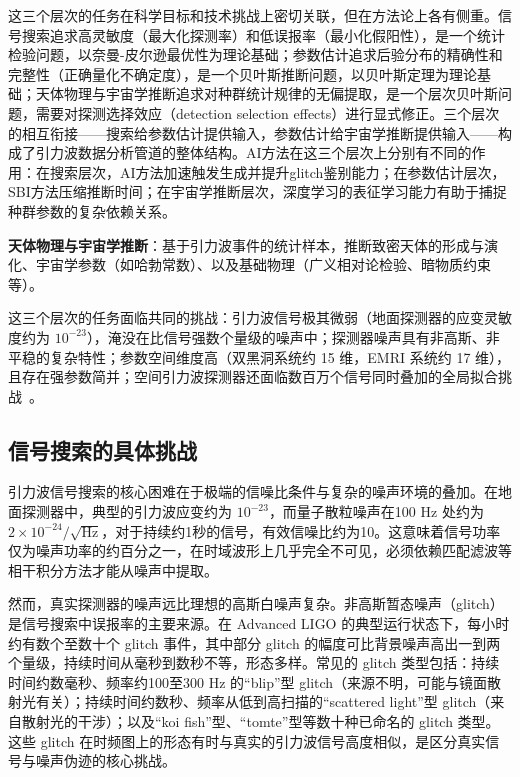 这三个层次的任务在科学目标和技术挑战上密切关联，但在方法论上各有侧重。信号搜索追求高灵敏度（最大化探测率）和低误报率（最小化假阳性），是一个统计检验问题，以奈曼-皮尔逊最优性为理论基础；参数估计追求后验分布的精确性和完整性（正确量化不确定度），是一个贝叶斯推断问题，以贝叶斯定理为理论基础；天体物理与宇宙学推断追求对种群统计规律的无偏提取，是一个层次贝叶斯问题，需要对探测选择效应（detection selection effects）进行显式修正。三个层次的相互衔接——搜索给参数估计提供输入，参数估计给宇宙学推断提供输入——构成了引力波数据分析管道的整体结构。AI方法在这三个层次上分别有不同的作用：在搜索层次，AI方法加速触发生成并提升glitch鉴别能力；在参数估计层次，SBI方法压缩推断时间；在宇宙学推断层次，深度学习的表征学习能力有助于捕捉种群参数的复杂依赖关系。

\textbf{天体物理与宇宙学推断}：基于引力波事件的统计样本，推断致密天体的形成与演化、宇宙学参数（如哈勃常数）、以及基础物理（广义相对论检验、暗物质约束等）。

这三个层次的任务面临共同的挑战：引力波信号极其微弱（地面探测器的应变灵敏度约为 $10^{-23}$），淹没在比信号强数个量级的噪声中；探测器噪声具有非高斯、非平稳的复杂特性；参数空间维度高（双黑洞系统约 15 维，EMRI 系统约 17 维），且存在强参数简并；空间引力波探测器还面临数百万个信号同时叠加的全局拟合挑战~\cite{wang2024challenges}。

\subsection{信号搜索的具体挑战}

引力波信号搜索的核心困难在于极端的信噪比条件与复杂的噪声环境的叠加。在地面探测器中，典型的引力波应变约为 $10^{-23}$，而量子散粒噪声在100 Hz 处约为 $2\times10^{-24}/\sqrt{\text{Hz}}$，对于持续约1秒的信号，有效信噪比约为10。这意味着信号功率仅为噪声功率的约百分之一，在时域波形上几乎完全不可见，必须依赖匹配滤波等相干积分方法才能从噪声中提取。

然而，真实探测器的噪声远比理想的高斯白噪声复杂。非高斯暂态噪声（glitch）是信号搜索中误报率的主要来源。在 Advanced LIGO 的典型运行状态下，每小时约有数个至数十个 glitch 事件，其中部分 glitch 的幅度可比背景噪声高出一到两个量级，持续时间从毫秒到数秒不等，形态多样。常见的 glitch 类型包括：持续时间约数毫秒、频率约100至300 Hz 的“blip”型 glitch（来源不明，可能与镜面散射光有关）；持续时间约数秒、频率从低到高扫描的“scattered light”型 glitch（来自散射光的干涉）；以及“koi fish”型、“tomte”型等数十种已命名的 glitch 类型。这些 glitch 在时频图上的形态有时与真实的引力波信号高度相似，是区分真实信号与噪声伪迹的核心挑战。


